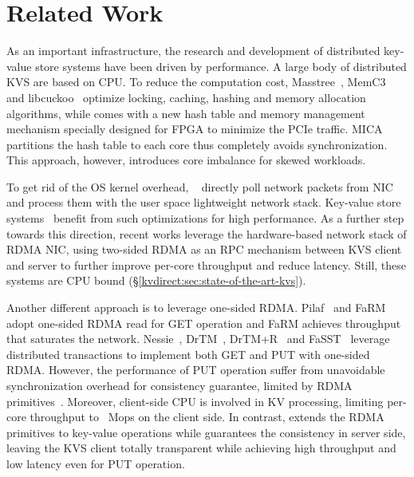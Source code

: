 \section{Related Work}
\label{kvdirect:sec:related}

As an important infrastructure, the research and development of distributed key-value store systems have been driven by performance. A large body of distributed KVS are based on CPU. To reduce the computation cost, Masstree~\cite{mao2012cache}, MemC3~\cite{fan2013memc3} and libcuckoo~\cite{li2014algorithmic} optimize locking, caching, hashing and memory allocation algorithms, while \oursys{} comes with a new hash table and memory management mechanism specially designed for FPGA to minimize the PCIe traffic. MICA~\cite{lim2014mica} partitions the hash table to each core thus completely avoids synchronization. This approach, however, introduces core imbalance for skewed workloads.

To get rid of the OS kernel overhead, ~\cite{rizzo2012netmap, intel2014data} directly poll network packets from NIC and \cite{jeong2014mtcp, marinos2014network} process them with the user space lightweight network stack.
Key-value store systems~\cite{kapoor2012chronos, ousterhout2010case, ousterhout2015ramcloud, lim2014mica,li2016full} benefit from such optimizations for high performance.
As a further step towards this direction, recent works \cite{infiniband2000infiniband, kalia2014using, kalia2016design, kalia2014using, kalia2016design} leverage the hardware-based network stack of RDMA NIC, using two-sided RDMA as an RPC mechanism between KVS client and server to further improve per-core throughput and reduce latency. Still, these systems are CPU bound (\S\ref{kvdirect:sec:state-of-the-art-kvs}).

Another different approach is to leverage one-sided RDMA. Pilaf~\cite{mitchell2013using} and FaRM~\cite{dragojevic2014farm} adopt one-sided RDMA read for GET operation and FaRM achieves throughput that saturates the network. Nessie~\cite{szepesi2014designing}, DrTM~\cite{wei2015fast}, DrTM+R~\cite{chen2016fast} and FaSST~\cite{kalia2016fasst} leverage distributed transactions to implement both GET and PUT with one-sided RDMA. However, the performance of PUT operation suffer from unavoidable synchronization overhead for consistency guarantee, limited by RDMA primitives~\cite{kalia2016design}. Moreover, client-side CPU is involved in KV processing, limiting per-core throughput to ~Mops on the client side.
In contrast, \oursys{} extends the RDMA primitives to key-value operations while guarantees the consistency in server side, leaving the KVS client totally transparent while achieving high throughput and low latency even for PUT operation.

